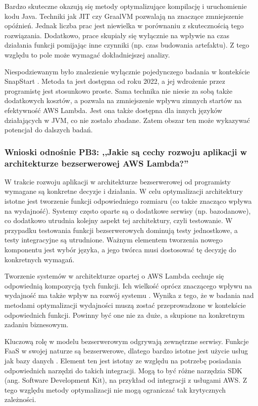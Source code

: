 Bardzo skuteczne okazują się metody optymalizujące kompilację i uruchomienie kodu Java.
Techniki jak JIT \cite{10.1145/3458336.3465305} czy GraalVM \cite{menéndez2023performancebestpracticesusing}\cite{ritzal2020optimizing} pozwalają na znaczące zmniejszenie opóźnień.
Jednak liczba prac jest niewielka w porównaniu z skutecznością tego rozwiązania.
Dodatkowo, prace skupiały się wyłącznie na wpływie na czas działania funkcji pomijając inne czynniki (np. czas budowania artefaktu).
Z tego względu to pole może wymagać dokładniejszej analizy.

Niespodziewanym było znalezienie wyłącznie pojedynczego badania w kontekście SnapStart \cite{menéndez2023performancebestpracticesusing}.
Metoda ta jest dostępna od roku 2022, a jej wdrożenie przez programistę jest stosunkowo proste.
Sama technika nie niesie za sobą także dodatkowych kosztów, a pozwala na zmniejszenie wpływu zimnych startów na efektywność AWS Lambda.
Jest ona także dostępna dla innych języków działających w JVM, co nie zostało zbadane.
Zatem obszar ten może wykazywać potencjał do dalszych badań.

\subsubsection*{Wnioski odnośnie PB3: ,,Jakie są cechy rozwoju aplikacji w architekturze bezserwerowej AWS Lambda?''}

W trakcie rozwoju aplikacji w architekturze bezserwerowej od programisty wymagane są konkretne decyzje i działania.
W celu optymalizacji architektury istotne jest tworzenie funkcji odpowiedniego rozmiaru (co także znacząco wpływa na wydajność).
Systemy często oparte są o dodatkowe serwisy (np. bazodanowe), co dodatkowo utrudnia kolejny aspekt tej architektury, czyli testowanie.
W przypadku testowania funkcji bezserwerowych dominują testy jednostkowe, a testy integracyjne są utrudnione.
Ważnym elementem tworzenia nowego komponentu jest wybór języka, a jego twórca musi dostosować tę decyzję do konkretnych wymagań.

Tworzenie systemów w architekturze opartej o AWS Lambda cechuje się odpowiednią kompozycją tych funkcji.
Ich wielkość oprócz znaczącego wpływu na wydajność ma także wpływ na rozwój systemu \cite{9095731}\cite{9912641}.
Wynika z tego, że w badania nad metodami optymalizacji wydajności muszą zostać przeprowadzone w kontekście odpowiednich funkcji.
Powinny być one nie za duże, a skupione na konkretnym zadaniu biznesowym.

Kluczową rolę w modelu bezserwerowym odgrywają zewnętrzne serwisy. 
Funkcje FaaS w swojej naturze są bezserwerowe, dlatego bardzo istotne jest użycie usług jak bazy danych \cite{eismann2021reviewserverlessusecases}.
Element ten jest istotny ze względu na potrzebę posiadania odpowiednich narzędzi do takich integracji.
Mogą to być różne narzędzia SDK (ang. Software Development Kit), na przykład od integracji z usługami AWS.
Z tego względu metody optymalizacji nie mogą ograniczać tak krytycznych zależności.

